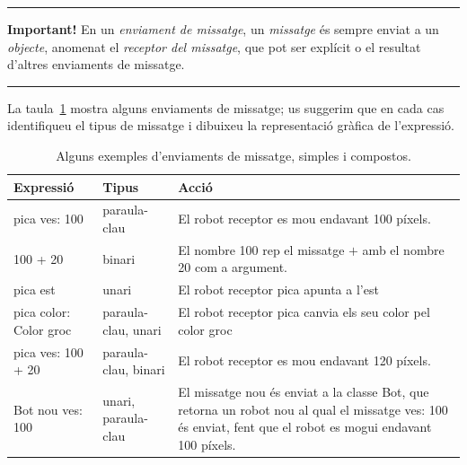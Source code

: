 \noindent
\rule{\textwidth}{2pt}
\noindent
\textbf{Important!} En un \emph{enviament de missatge}, un \emph{missatge} és sempre enviat a un \emph{objecte}, anomenat el \emph{receptor del missatge}, que pot ser explícit o el resultat d'altres enviaments de missatge.

\noindent
\rule{\textwidth}{2pt}
\vspace{3mm}

La taula~\ref{tab1101} mostra alguns enviaments de missatge; us suggerim que en cada cas identifiqueu el tipus de missatge i dibuixeu la representació gràfica de l'expressió.
\begin{table}[h]
\caption{Alguns exemples d'enviaments de missatge, simples i compostos.}
\label{tab1101}
\begin{center}
{\small \begin{tabular}{p{40mm}p{40mm}p{60mm}}
\hline
\textbf{Expressió} & \textbf{Tipus} & \textbf{Acció}\\
\hline
\textsf{pica ves: 100} & paraula-clau & El robot receptor es mou endavant 100 píxels.\\
\textsf{100 + 20} & binari & El nombre \textsf{100} rep el missatge \textsf{$+$} amb el nombre \textsf{20} com a argument.\\
\textsf{pica est} & unari & El robot receptor \textsf{pica} apunta a l'\textsf{est}\\
\textsf{pica color: Color groc} & paraula-clau, unari & El robot receptor \textsf{pica} canvia els seu color pel color groc\\
\textsf{pica ves: 100 + 20} & paraula-clau, binari & El robot receptor es mou endavant 120 píxels.\\
\textsf{Bot nou ves: 100} & unari, paraula-clau & El missatge \textsf{nou} és enviat a la classe \textsf{Bot}, que retorna un robot nou al qual el missatge \textsf{ves: 100} és enviat, fent que el robot es mogui endavant 100 píxels.\\
\hline
\end{tabular}}
\end{center}
\end{table}

